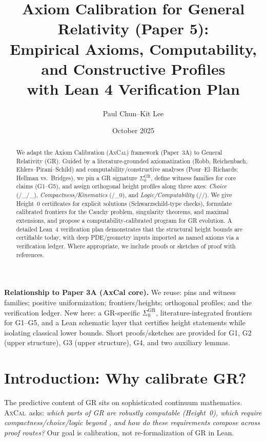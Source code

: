 \documentclass[11pt]{article}
\title{Axiom Calibration for General Relativity (Paper 5):\\
Empirical Axioms, Computability, and Constructive Profiles\\
with Lean 4 Verification Plan}
\author{Paul Chun--Kit Lee}
\date{October 2025}
\theoremstyle{definition}
\theoremstyle{remark}
\newcommand{\BISH}{\mathsf{BISH}}
\newcommand{\WLPO}{\mathrm{WLPO}}
\newcommand{\LEM}{\mathrm{LEM}}
\newcommand{\FT}{\mathrm{FT}}
\newcommand{\WKLz}{\mathrm{WKL}_0}
\newcommand{\MP}{\mathrm{MP}}
\newcommand{\AC}{\mathrm{AC}}
\newcommand{\ACw}{\mathrm{AC}_\omega}
\newcommand{\DCw}{\mathrm{DC}_\omega}
\newcommand{\SigmaZero}{\Sigma_{0}}
\newcommand{\AxCal}{\textsc{AxCal}}
\begin{document}
\maketitle

\begin{abstract}
We adapt the Axiom Calibration (\AxCal) framework (Paper~3A) to General Relativity (GR). Guided by a literature-grounded axiomatization (Robb, Reichenbach, Ehlers--Pirani--Schild) and computability/constructive analyses (Pour--El--Richards; Hellman vs.\ Bridges), we pin a GR signature $\SigmaZero^{\mathrm{GR}}$, define witness families for core claims (G1--G5), and assign orthogonal height profiles along three axes: \emph{Choice} (\AC/\DCw/\ACw), \emph{Compactness/Kinematics} (\FT/\WKLz), and \emph{Logic/Computability} (\WLPO/\LEM/\MP). We give Height~0 certificates for explicit solutions (Schwarzschild-type checks), formulate calibrated frontiers for the Cauchy problem, singularity theorems, and maximal extensions, and propose a computability-calibrated program for GR evolution. A detailed Lean~4 verification plan demonstrates that the structural height bounds are certifiable today, with deep PDE/geometry inputs imported as named axioms via a verification ledger. Where appropriate, we include proofs or sketches of proof with references.
\end{abstract}

\begin{mdframed}[style=status]
\textbf{Relationship to Paper 3A (AxCal core).}
We reuse: pins and witness families; positive uniformization; frontiers/heights; orthogonal profiles; and the verification ledger. New here: a GR-specific $\SigmaZero^{\mathrm{GR}}$, literature-integrated frontiers for G1--G5, and a Lean schematic layer that certifies height statements while isolating classical lower bounds. Short proofs/sketches are provided for G1, G2 (upper structure), G3 (upper structure), G4, and two auxiliary lemmas.
\end{mdframed}

\tableofcontents

\section{Introduction: Why calibrate GR?}
The predictive content of GR sits on sophisticated continuum mathematics. \AxCal\ asks: \emph{which parts of GR are robustly computable (Height~0), which require compactness/choice/logic beyond \BISH, and how do these requirements compose across proof routes?} Our goal is calibration, not re-formalization of GR in Lean.
\end{document}
